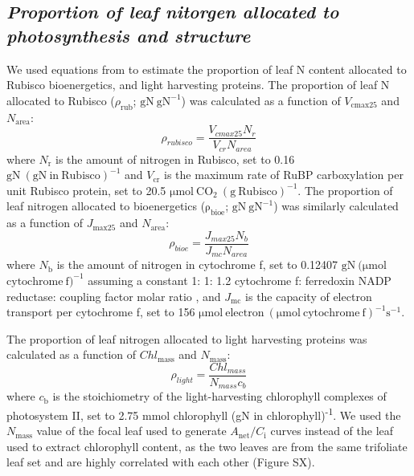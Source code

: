 \subsection{\textit{Proportion of leaf nitorgen allocated to photosynthesis and structure}}

We used equations from  to estimate the proportion of leaf N content allocated to Rubisco bioenergetics, and light harvesting proteins. The proportion of leaf N allocated to Rubisco ($\rho_\mathrm{{rub}}$; $\mathrm{gN\ gN^{-1}}$) was calculated as a function of $V_\mathrm{cmax25}$ and $N_\mathrm{area}$: 
\begin{equation} \label{eqn_5.6}
    \rho_{rubisco}=\frac{V_{cmax25}N_r}{V_{cr}N_{area}}
\end{equation}
\noindent where $N_\mathrm{r}$ is the amount of nitrogen in Rubisco, set to 0.16 $\mathrm{gN\ (gN\ in\ Rubisco)^{-1}}$ and $V_\mathrm{cr}$ is the maximum rate of RuBP carboxylation per unit Rubisco protein, set to 20.5 $\mathrm{\mu mol\ CO_2\ (g\ Rubisco)^{-1}}$. The proportion of leaf nitrogen allocated to bioenergetics ($\mathrm{\rho_{bioe}}$; $\mathrm{gN\ gN^{-1}}$) was similarly calculated as a function of $J_\mathrm{max25}$ and $N_\mathrm{area}$:
\begin{equation} \label{eqn_5.7}
    \rho_{bioe}=\frac{J_{max25}N_b}{J_{mc}N_{area}}
\end{equation}
\noindent where $N_\mathrm{b}$ is the amount of nitrogen in cytochrome f, set to 0.12407 $\mathrm{gN\ (\mu mol}$ $\mathrm{cytochrome\ f)^{-1}}$ assuming a constant 1: 1: 1.2 cytochrome f: ferredoxin NADP reductase: coupling factor molar ratio , and $J_\mathrm{mc}$ is the capacity of electron transport per cytochrome f, set to 156 $\mathrm{\mu mol\ electron\ (\mu mol\ cytochrome\ f)^{-1} s^{-1}}$.

The proportion of leaf nitrogen allocated to light harvesting proteins was calculated as a function of $Chl_\mathrm{{mass}}$ and $N_\mathrm{{mass}}$:
\begin{equation} \label{eqn_5.8}
    \rho_{light}=\frac{Chl_{mass}}{N_{mass}c_{b}}
\end{equation}
\noindent where $c_\mathrm{{b}}$ is the stoichiometry of the light-harvesting chlorophyll complexes of photosystem II, set to 2.75 mmol chlorophyll (gN in chlorophyll)\textsuperscript{-1}. We used the $N_\mathrm{{mass}}$ value of the focal leaf used to generate $A_\mathrm{{net}}/C_\mathrm{i}$ curves instead of the leaf used to extract chlorophyll content, as the two leaves are from the same trifoliate leaf set and are highly correlated with each other (Figure SX).

